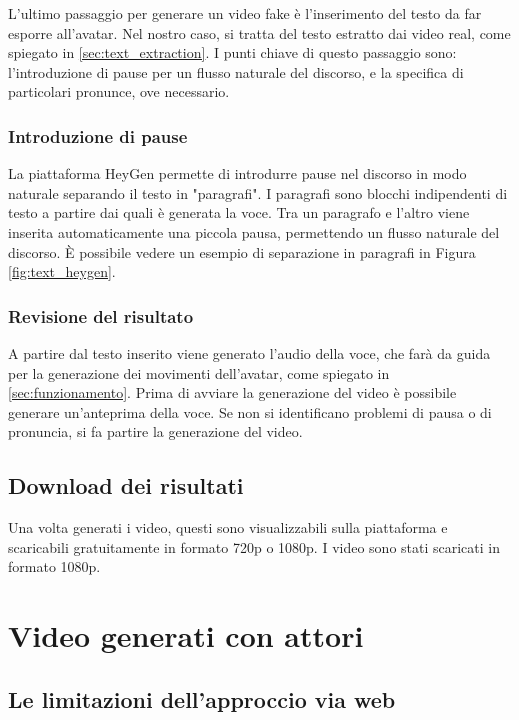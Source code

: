 L'ultimo passaggio per generare un video fake è l'inserimento del testo da far esporre all'avatar. Nel nostro caso, si tratta del testo estratto dai video real, come spiegato in \ref{sec:text_extraction}. 
I punti chiave di questo passaggio sono: l'introduzione di pause per un flusso naturale del discorso, e la specifica di particolari pronunce, ove necessario.

\subsubsection{Introduzione di pause}
    
La piattaforma HeyGen permette di introdurre pause nel discorso in modo naturale separando il testo in "paragrafi". I paragrafi sono blocchi indipendenti di testo a partire dai quali è generata la voce. Tra un paragrafo e l'altro viene inserita automaticamente una piccola pausa, permettendo un flusso naturale del discorso. È possibile vedere un esempio di separazione in paragrafi in Figura \ref{fig:text_heygen}.

\subsubsection{Revisione del risultato}

A partire dal testo inserito viene generato l'audio della voce, che farà da guida per la generazione dei movimenti dell'avatar, come spiegato in \ref{sec:funzionamento}. Prima di avviare la generazione del video è possibile generare un'anteprima della voce. Se non si identificano problemi di pausa o di pronuncia, si fa partire la generazione del video.

\subsection{Download dei risultati}

Una volta generati i video, questi sono visualizzabili sulla piattaforma e scaricabili gratuitamente in formato 720p o 1080p. I video sono stati scaricati in formato 1080p.

\section{Video generati con attori}
\label{sec:generati_con_attori}

\subsection{Le limitazioni dell'approccio via web}

